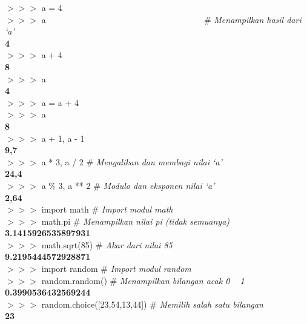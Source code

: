 \begin{IDLE}
\begin{tabbing}
$>>>$ a = 4\\
$>>>$ a ~~~~~~~~~~~~~~~~~~~~~~~~~~~~~~~~~~~~ \= \# \textit{Menampilkan hasil dari `a'}\\
\textbf{4}\\
$>>>$ a + 4\\
\textbf{8}\\
$>>>$ a\\
\textbf{4}\\
$>>>$ a = a + 4\\
$>>>$ a\\
\textbf{8}\\
$>>>$ a + 1, a - 1\\ 
\textbf{9,7}\\
$>>>$ a * 3, a / 2 \> \# \textit{Mengalikan dan membagi nilai `a'}\\
\textbf{24,4}\\
$>>>$ a \% 3, a ** 2 \> \# \textit{Modulo dan eksponen nilai `a'}\\
\textbf{2,64}\\
$>>>$ import math \> \# \textit{Import modul math}\\
$>>>$ math.pi \> \# \textit{Menampilkan nilai pi (tidak semuanya)}\\
\textbf{3.1415926535897931}\\
$>>>$ math.sqrt(85) \> \# \textit{Akar dari nilai 85}\\
\textbf{9.2195444572928871} \\
$>>>$ import random \> \# \textit{Import modul random}\\
$>>>$ random.random() \> \# \textit{Menampilkan bilangan acak 0 ~ 1}\\
\textbf{0.3990536432569244}\\
$>>>$ random.choice([23,54,13,44]) \> \# \textit{Memilih salah satu bilangan}\\
\textbf{23}\\
\end{tabbing}
\end{IDLE}

